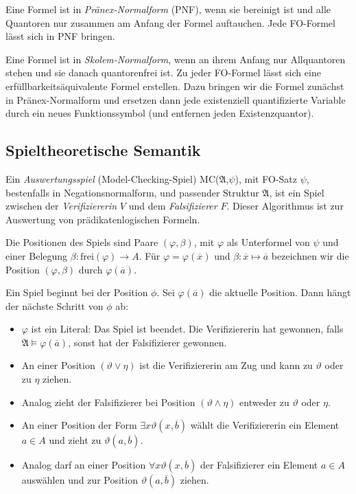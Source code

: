 \documentclass[a4paper,parskip=half*,DIV=15,fontsize=11pt]{scrartcl}
\newcommand{\A}{\mathfrak{A}}
\begin{document}
Eine Formel ist in \emph{Pränex-Normalform} (PNF), wenn sie bereinigt ist und alle Quantoren nur zusammen am Anfang der Formel auftauchen. Jede FO-Formel lässt sich in PNF bringen.

Eine Formel ist in \emph{Skolem-Normalform}, wenn an ihrem Anfang nur Allquantoren stehen und sie danach quantorenfrei ist. Zu jeder FO-Formel lässt sich eine erfüllbarkeitsäquivalente Formel erstellen. Dazu bringen wir die Formel zunächst in Pränex-Normalform und ersetzen dann jede existenziell quantifizierte Variable durch ein neues Funktionssymbol (und entfernen jeden Existenzquantor).


\subsection{Spieltheoretische Semantik}
Ein \emph{Auswertungsspiel} (Model-Checking-Spiel) MC($\A$,$\psi$), mit FO-Satz $\psi$, bestenfalls in Negationsnormalform, und passender Struktur $\A$, ist ein Spiel zwischen der \emph{Verifiziererin} $V$ und dem \emph{Falsifizierer} $F$. Dieser Algorithmus ist zur Auswertung von prädikatenlogischen Formeln.

Die Positionen des Spiels sind Paare $(\varphi,\beta)$, mit $\varphi$ als Unterformel von $\psi$ und einer Belegung $\beta:\mathrm{frei}(\varphi)\to A$. Für $\varphi=\varphi(\overline{x})$ und $\beta:\overline{x}\mapsto\overline{a}$ bezeichnen wir die Position $(\varphi,\beta)$ durch $\varphi(\overline{a})$.

Ein Spiel beginnt bei der Position $\phi$. Sei $\varphi(\overline{a})$ die aktuelle Position. Dann hängt der nächste Schritt von $\phi$ ab:
\begin{itemize}
    \item $\varphi$ ist ein Literal: Das Spiel ist beendet. Die Verifiziererin hat gewonnen, falls $\A \models \varphi(\overline{a})$, sonst hat der Falsifizierer gewonnen.
    \item An einer Position $(\vartheta \lor \eta)$ ist die Verifiziererin am Zug und kann zu $\vartheta$ oder zu $\eta$ ziehen.
    \item Analog zieht der Falsifizierer bei Position $(\vartheta \land \eta)$ entweder zu $\vartheta$ oder $\eta$.
    \item An einer Position der Form $\exists x \vartheta (x,\overline{b})$ wählt die Verifiziererin ein Element $a \in A$ und zieht zu $\vartheta(a,\overline{b})$.
    \item Analog darf an einer Position $\forall x \vartheta(x,\overline{b})$ der Falsifizierer ein Element $a \in A$ auswählen und zur Position $\vartheta(a,\overline{b})$ ziehen.
\end{itemize}
\end{document}
